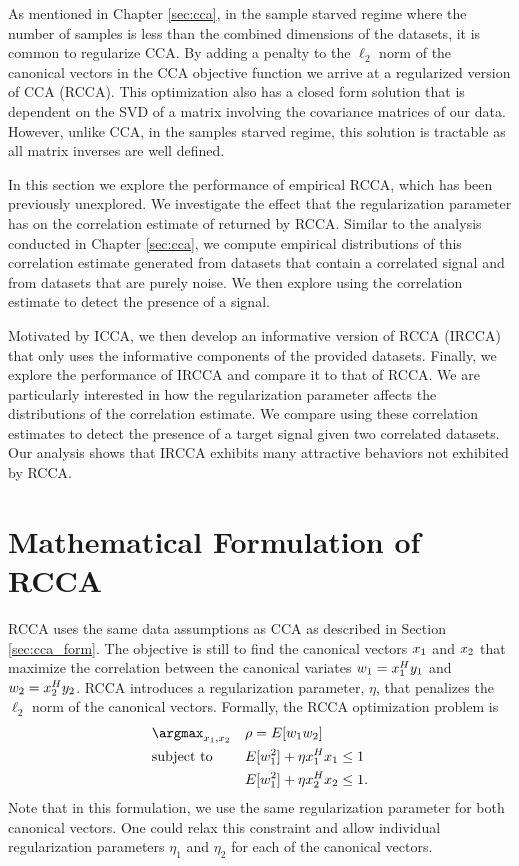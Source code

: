 As mentioned in Chapter \ref{sec:cca}, in the sample starved regime where the number of
samples is less than the combined dimensions of the datasets, it is common to
regularize CCA. By adding a penalty to the $\ell_2$ norm of the canonical vectors in the
CCA objective function we arrive at a regularized version of CCA (RCCA). This optimization
also has a closed form solution that is dependent on the SVD of a matrix involving the
covariance matrices of our data. However, unlike CCA, in the samples starved regime, this
solution is tractable as all matrix inverses are well defined. 

In this section we explore the performance of empirical RCCA, which has been previously
unexplored. We investigate the effect that the regularization parameter has on the
correlation estimate of returned by RCCA. Similar to the analysis conducted in Chapter
\ref{sec:cca}, we compute empirical distributions of this correlation estimate generated
from datasets that contain a correlated signal and from datasets that are purely noise. We
then explore using the correlation estimate to detect the presence of a signal.

Motivated by ICCA, we then develop an informative version of RCCA (IRCCA) that only uses
the informative components of the provided datasets. Finally, we explore the performance
of IRCCA and compare it to that of RCCA. We are particularly interested in how the
regularization parameter affects the distributions of the correlation estimate. We compare
using these correlation estimates to detect the presence of a target signal given two
correlated datasets. Our analysis shows that IRCCA exhibits many attractive behaviors not
exhibited by RCCA.

\section{Mathematical Formulation of RCCA}
RCCA uses the same data assumptions as CCA as described in Section \ref{sec:cca_form}. The
objective is still to find the canonical vectors $x_1$ and $x_2$ that maximize the correlation
between the canonical variates $w_1=x_1^Hy_1$ and $w_2=x_2^Hy_2$. RCCA introduces a
regularization parameter, $\eta$, that penalizes the $\ell_2$ norm of the canonical
vectors. Formally, the RCCA optimization problem is
\begin{equation}\label{eq:rcca_opt1}
  \begin{aligned}
    &\argmax_{\xI,\xII}&&\rho = E[\wI\wII]\\
    & \text{subject to}&& E[\wI^2] + \eta \xI^H\xI\leq 1\\
    &&& E[\wI^2] + \eta \xII^H\xII\leq 1.\\
  \end{aligned}
\end{equation}
Note that in this formulation, we use the same regularization parameter for both canonical
vectors. One could relax this constraint and allow individual regularization parameters
$\eta_1$ and $\eta_2$ for each of the canonical vectors. 

